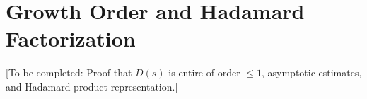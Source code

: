 \section{Growth Order and Hadamard Factorization}

[To be completed: Proof that $D(s)$ is entire of order $\leq 1$, asymptotic estimates, and Hadamard product representation.]
